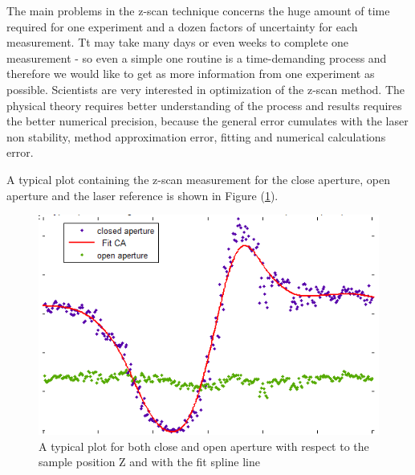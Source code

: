 \documentclass[12pt,twoside,a4paper]{article}
\numberwithin{equation}{subsection}
\numberwithin{figure}{subsection}
\begin{document}
The main problems in the z-scan technique concerns the huge amount of time required for one experiment and a dozen factors of uncertainty
for each measurement. Tt may take many days or even weeks to complete one measurement - so even a simple one routine is a time-demanding
process and therefore we would like to get as more information from one experiment as possible.
Scientists are very interested in optimization of the z-scan method. The physical theory requires better understanding of the process and
results requires the better numerical precision, because the general error cumulates with the laser non stability, method
approximation error, fitting and numerical calculations error.

A typical plot containing the z-scan measurement for the close aperture, open aperture and the laser reference is shown in Figure
(\ref{fig:zscan_both}).

\begin{figure} 
  \includegraphics{img/zscan_both.png}
  \caption{A typical plot for both close and open aperture with respect to the sample position Z and with the fit spline line
  \label{fig:zscan_both}} 
\end{figure}
\end{document}
